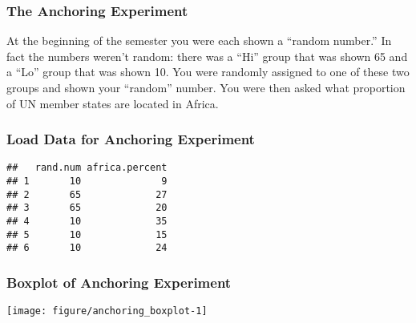 \begin{frame}
\frametitle{The Anchoring Experiment}
At the beginning of the semester you were each shown a ``random number.'' In fact the numbers weren't random: there was a ``Hi'' group that was shown 65 and a ``Lo'' group that was shown 10. You were randomly assigned to one of these two groups and shown your ``random'' number. You were then asked what proportion of UN member states are located in Africa.  


\end{frame}
\begin{frame}[fragile]\frametitle{Load Data for Anchoring Experiment}
\footnotesize
\begin{knitrout}
\color{fgcolor}\begin{kframe}
\begin{alltt}
 \hlkwb{<-} 
 \hlkwb{<-} 
 \hlkwb{<-} \hlstd{survey[,}\hlstd{(}\hlstd{,} \hlstd{)]}
\end{alltt}
\begin{verbatim}
##   rand.num africa.percent
## 1       10              9
## 2       65             27
## 3       65             20
## 4       10             35
## 5       10             15
## 6       10             24
\end{verbatim}
\end{kframe}
\end{knitrout}

\end{frame}
\begin{frame}[t,fragile]\frametitle{Boxplot of Anchoring Experiment}
  \footnotesize
\begin{knitrout}
\color{fgcolor}\begin{kframe}
\begin{alltt}
 \hlopt{~}   
\end{alltt}
\end{kframe}

{\centering \texttt{[image: figure/anchoring\_boxplot-1]} 

}



\end{knitrout}
\end{frame}

